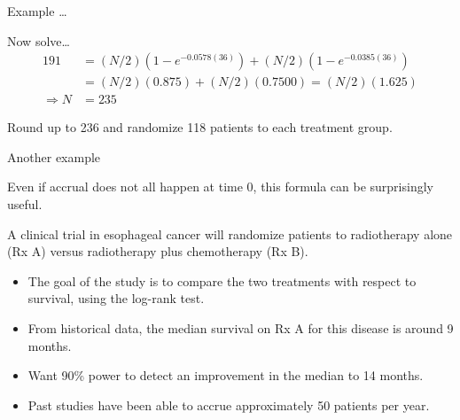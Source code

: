 \documentclass[ignorenonframetext,]{beamer}
\begin{document}
\begin{frame}{%
\protect\hypertarget{example-3}{%
Example \ldots}}

Now solve\ldots \begin{align*}
191 &=  (N/2)(1 - e^{-0.0578(36)}) + (N/2)(1 - e^{-0.0385(36)})\\[1ex]
    &=  (N/2)(0.875) + (N/2)(0.7500) = (N/2)(1.625)\\[1ex]
\Rightarrow N &= 235
\end{align*}

Round up to 236 and randomize 118 patients to each treatment group.

\end{frame}

\begin{frame}{%
\protect\hypertarget{another-example}{%
Another example}}

Even if accrual does not all happen at time 0, this formula can be
surprisingly useful.

A clinical trial in esophageal cancer will randomize patients to
radiotherapy alone (Rx A) versus radiotherapy plus chemotherapy (Rx B).

\begin{itemize}
\item
  The goal of the study is to compare the two treatments with respect to
  survival, using the log-rank test.
\item
  From historical data, the median survival on Rx A for this disease is
  around 9 months.
\item
  Want 90\% power to detect an improvement in the median to 14 months.
\item
  Past studies have been able to accrue approximately 50 patients per
  year.
\end{itemize}

\end{frame}
\end{document}
